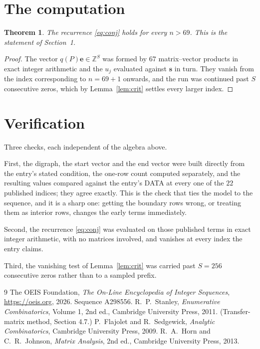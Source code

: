 \documentclass[11pt,a4paper]{article}
\theoremstyle{plain}
\newtheorem{theorem}{Theorem}
\theoremstyle{definition}
\begin{document}
\section{The computation}

\begin{theorem}
The recurrence \eqref{eq:conj} holds for every $n>69$. This is the statement of
Section~1.
\end{theorem}

\begin{proof}
The vector $q(P)\mathbf{e}\in\mathbb{Z}^{S}$ was formed by $67$ matrix--vector
products in exact integer arithmetic and the $u_j$ evaluated against $\mathbf{s}$ in turn.
They vanish from the index corresponding to $n=69+1$ onwards, and the run was continued
past $S$ consecutive zeros, which by Lemma~\ref{lem:crit} settles every larger index.
\end{proof}

\section{Verification}

Three checks, each independent of the algebra above.

First, the digraph, the start vector and the end vector were built directly from the
entry's stated condition, the one-row count computed separately, and the resulting values
compared against the entry's DATA at every one of the $22$ published indices; they
agree exactly. This is the check that ties the model to the sequence, and it is a sharp one:
getting the boundary rows wrong, or treating them as interior rows, changes the early terms
immediately.

Second, the recurrence \eqref{eq:conj} was evaluated on those published terms in exact
integer arithmetic, with no matrices involved, and vanishes at every index the entry claims.

Third, the vanishing test of Lemma~\ref{lem:crit} was carried past $S=256$ consecutive
zeros rather than to a sampled prefix.

\begin{thebibliography}{9}
 The OEIS Foundation, \emph{The On-Line Encyclopedia of Integer
Sequences}, \url{https://oeis.org}, 2026. Sequence A298556.
 R.~P.~Stanley, \emph{Enumerative Combinatorics}, Volume 1, 2nd ed.,
Cambridge University Press, 2011. (Transfer-matrix method, Section 4.7.)
 P.~Flajolet and R.~Sedgewick, \emph{Analytic Combinatorics}, Cambridge
University Press, 2009.
 R.~A.~Horn and C.~R.~Johnson, \emph{Matrix Analysis}, 2nd ed., Cambridge
University Press, 2013.
\end{thebibliography}
\end{document}
